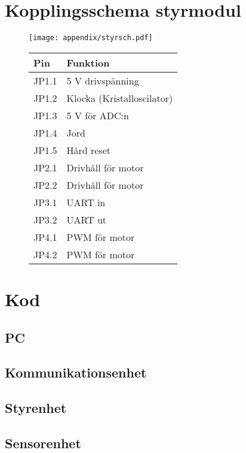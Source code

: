 \section{Kopplingsschema styrmodul}
\label{styr-sch}
  \begin{figure}[ht!]
    \centering
      \texttt{[image: appendix/styrsch.pdf]}
      \begin{tabular}{| l | l |}
        \hline
        \textbf{Pin} & \textbf{Funktion} \\ \hline
        JP1.1 & 5 V drivspänning \\ \hline
        JP1.2 & Klocka (Kristalloscilator) \\ \hline
        JP1.3 & 5 V för ADC:n \\ \hline
        JP1.4 & Jord \\ \hline
        JP1.5 & Hård reset \\ \hline
        JP2.1 & Drivhåll för motor \\ \hline
        JP2.2 & Drivhåll för motor \\ \hline
        JP3.1 & UART in \\ \hline
        JP3.2 & UART ut \\ \hline
        JP4.1 & PWM för motor \\ \hline
        JP4.2 & PWM för motor \\ \hline
      \end{tabular}
    \end{figure}
\section{Kod}
\subsection{PC}
\subsection{Kommunikationsenhet}
\subsection{Styrenhet}
\subsection{Sensorenhet}
